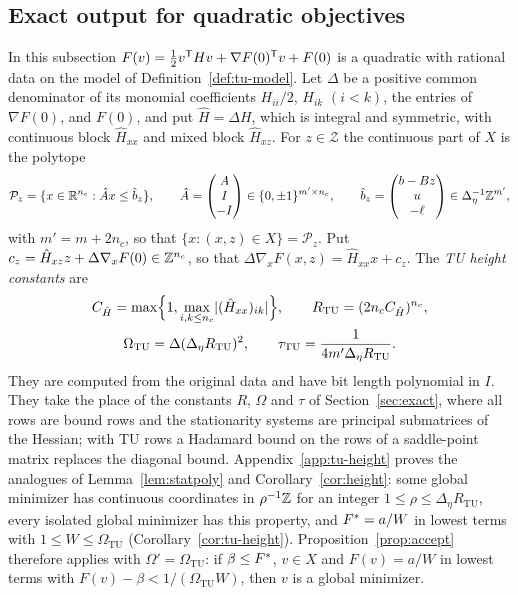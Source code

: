 \subsection{Exact output for quadratic objectives}\label{sec:tu-exact}

In this subsection $F(v)=\frac12v^{\mathsf T}Hv+\nabla F(0)^{\mathsf T}v+F(0)$ is a
quadratic with rational data on the model of Definition~\ref{def:tu-model}.
Let $\Delta$ be a positive common denominator of its monomial coefficients
$H_{ii}/2$, $H_{ik}$ $(i<k)$, the entries of $\nabla F(0)$, and $F(0)$, and
put $\hat H=\Delta H$, which is
integral and symmetric, with continuous block $\hat H_{xx}$ and mixed block
$\hat H_{xz}$. For $z\in\mathcal Z$ the continuous part of $X$ is the polytope
\[
\mathcal P_z=\{x\in\mathbb R^{n_c}:\hat Ax\le\hat b_z\},\qquad
\hat A=\begin{pmatrix}A\\ I\\ -I\end{pmatrix}\in\{0,\pm1\}^{m'\times n_c},\qquad
\hat b_z=\begin{pmatrix}b-Bz\\ u\\ -\ell\end{pmatrix}\in\Delta_\eta^{-1}\mathbb Z^{m'},
\]
with $m'=m+2n_c$, so that $\{x:(x,z)\in X\}=\mathcal P_z$. Put
$c_z=\hat H_{xz}z+\Delta\nabla_xF(0)\in\mathbb Z^{n_c}$, so that
$\Delta\nabla_xF(x,z)=\hat H_{xx}x+c_z$. The \emph{TU height constants} are
\begin{equation}\label{eq:tu-constants}
\begin{gathered}
C_{\hat H}=\max\Bigl\{1,\max_{i,k\le n_c}\lvert(\hat H_{xx})_{ik}\rvert\Bigr\},\qquad
R_{\mathrm{TU}}=(2n_cC_{\hat H})^{n_c},\\
\Omega_{\mathrm{TU}}=\Delta(\Delta_\eta R_{\mathrm{TU}})^2,\qquad
\tau_{\mathrm{TU}}=\frac1{4m'\Delta_\eta R_{\mathrm{TU}}} .
\end{gathered}
\end{equation}
They are computed from the original data and have bit length polynomial in
$I$. They take the place of the constants $R$, $\Omega$ and $\tau$ of
Section~\ref{sec:exact}, where all rows are bound rows and the stationarity
systems are principal submatrices of the Hessian; with TU rows a Hadamard
bound on the rows of a saddle-point matrix replaces the diagonal bound.
Appendix~\ref{app:tu-height} proves the analogues of Lemma~\ref{lem:statpoly} and
Corollary~\ref{cor:height}: some global minimizer has continuous coordinates
in $\rho^{-1}\mathbb Z$ for an integer $1\le\rho\le\Delta_\eta R_{\mathrm{TU}}$, every
isolated global minimizer has this property, and $F^{*}=a/W$ in lowest terms
with $1\le W\le\Omega_{\mathrm{TU}}$ (Corollary~\ref{cor:tu-height}).
Proposition~\ref{prop:accept} therefore applies with
$\Omega'=\Omega_{\mathrm{TU}}$: if $\beta\le F^{*}$, $v\in X$ and $F(v)=a/W$ in
lowest terms with $F(v)-\beta<1/(\Omega_{\mathrm{TU}}W)$, then $v$ is a global
minimizer.

